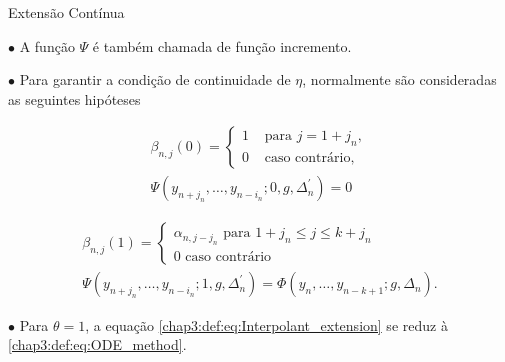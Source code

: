 \documentclass{beamer}
\theoremstyle{plain}
\theoremstyle{definition}
\begin{document}

\begin{frame}{Extensão Contínua}

    \phantom{aa} $\bullet$ A função $\Psi$ é também chamada de função incremento. 

    \phantom{aa} $\bullet$ Para garantir a condição de continuidade de $\eta$, normalmente são consideradas as seguintes hipóteses

    \[
        \begin{gathered}
            \beta_{n, j}(0)= \begin{cases}1 & \text { para } j=1+j_{n}, \\
            0 & \text { caso contrário, }\end{cases} \\
            \Psi\left(y_{n+j_{n}}, \ldots, y_{n-i_{n}} ; 0, g, \Delta_{n}^{\prime}\right)=0
            \end{gathered}
    \]

    \[
        \begin{gathered}
            \beta_{n, j}(1)=\left\{\begin{array}{l}
                    \alpha_{n, j-j_{n}} \text { para } 1+j_{n} \leq j \leq k+j_{n} \\
                    0 \text { caso contrário }
            \end{array}\right. \\
            \Psi\left(y_{n+j_{n}}, \ldots, y_{n-i_{n}} ; 1, g, \Delta_{n}^{\prime}\right)=\Phi\left(y_{n}, \ldots, y_{n-k+1} ; g, \Delta_{n}\right).
        \end{gathered}
    \]


        \phantom{aa} $\bullet$ Para $\theta=1$, a equação \eqref{chap3:def:eq:Interpolant_extension} se reduz à \eqref{chap3:def:eq:ODE_method}. 

    \end{frame}




\end{document}
